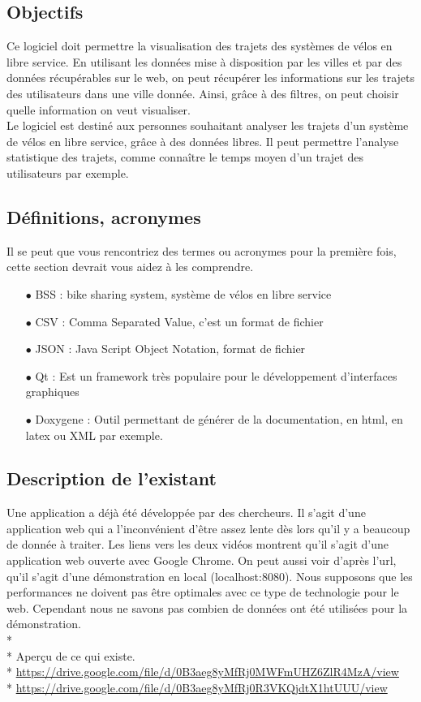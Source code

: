 \documentclass[12pt]{article}
\begin{document}
		\subsection{Objectifs}
			Ce logiciel doit permettre la visualisation des trajets des systèmes de vélos en libre service. En utilisant les données mise à disposition par les villes et par des données récupérables sur le web, on peut récupérer les informations sur les trajets des utilisateurs dans une ville donnée. Ainsi, grâce à des filtres, on peut choisir quelle information on veut visualiser.\\
			Le logiciel est destiné aux personnes souhaitant analyser les trajets d'un système de vélos en libre service, grâce à des données libres. Il peut permettre l'analyse statistique des trajets, comme connaître le temps moyen d'un trajet des utilisateurs par exemple.

		\subsection{Définitions, acronymes}
			Il se peut que vous rencontriez des termes ou acronymes pour la première fois, cette section devrait vous aidez à les comprendre.
			\begin{itemize}
				\item[$\bullet$] BSS : bike sharing system, système de vélos en libre service
				\item[$\bullet$] CSV : Comma Separated Value, c'est un format de fichier
				\item[$\bullet$] JSON : Java Script Object Notation, format de fichier
				\item[$\bullet$] Qt : Est un framework très populaire pour le développement d'interfaces graphiques
				\item[$\bullet$] Doxygene : Outil permettant de générer de la documentation, en html, en latex ou XML par exemple.
			\end{itemize}

		\subsection{Description de l'existant}
			Une application a déjà été développée par des chercheurs. Il s’agit d’une application web qui a l’inconvénient d’être assez lente dès lors qu’il y a beaucoup de donnée à traiter. Les liens vers les deux vidéos montrent qu'il s'agit d'une application web ouverte avec Google Chrome. On peut aussi voir d'après l'url, qu'il s'agit d'une démonstration en local (localhost:8080). Nous supposons que les performances ne doivent pas être optimales avec ce type de technologie pour le web. Cependant nous ne savons pas combien de données ont été utilisées pour la démonstration.\\*\\*
			Aperçu de ce qui existe.\\*
			\url{https://drive.google.com/file/d/0B3aeg8yMfRj0MWFmUHZ6ZlR4MzA/view}\\*
			\url{https://drive.google.com/file/d/0B3aeg8yMfRj0R3VKQjdtX1htUUU/view}
		
\end{document}
